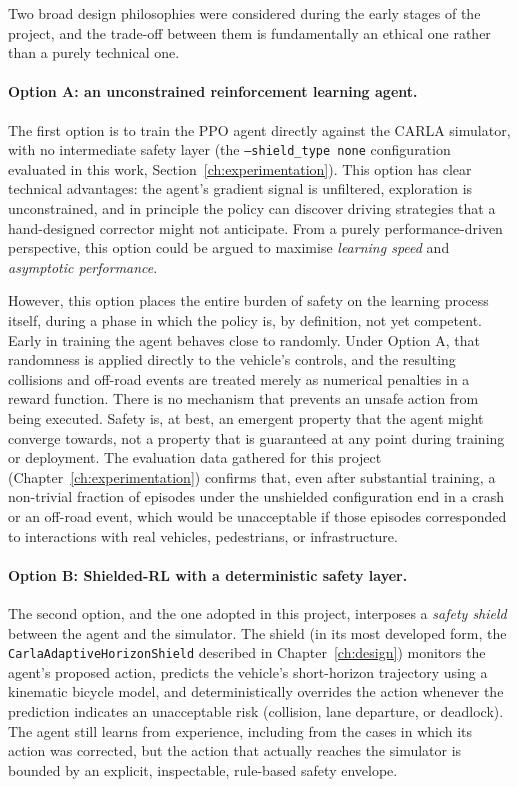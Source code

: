Two broad design philosophies were considered during the early stages of the project,
and the trade-off between them is fundamentally an ethical one rather than a purely
technical one.

\paragraph{Option A: an unconstrained reinforcement learning agent.}
The first option is to train the PPO agent directly against the CARLA simulator, with no
intermediate safety layer (the \texttt{--shield\_type none} configuration evaluated in
this work, Section~\ref{ch:experimentation}). This option has clear technical
advantages: the agent's gradient signal is unfiltered, exploration is unconstrained, and
in principle the policy can discover driving strategies that a hand-designed corrector
might not anticipate. From a purely performance-driven perspective, this option could be
argued to maximise \textit{learning speed} and \textit{asymptotic performance}.

However, this option places the entire burden of safety on the learning process itself,
during a phase in which the policy is, by definition, not yet competent. Early in
training the agent behaves close to randomly. Under Option A, that randomness is applied
directly to the vehicle's controls, and the resulting collisions and off-road events are
treated merely as numerical penalties in a reward function. There is no mechanism that
prevents an unsafe action from being executed. Safety is, at best, an emergent
property that the agent might converge towards, not a property that is guaranteed at any
point during training or deployment. The evaluation data gathered for this project
(Chapter~\ref{ch:experimentation}) confirms that, even after substantial training, a
non-trivial fraction of episodes under the unshielded configuration end in a crash or an
off-road event, which would be unacceptable if those episodes corresponded to interactions
with real vehicles, pedestrians, or infrastructure.

\paragraph{Option B: Shielded-RL with a deterministic safety layer.}
The second option, and the one adopted in this project, interposes a \textit{safety
shield} between the agent and the simulator. The shield (in its most developed form,
the \texttt{CarlaAdaptiveHorizonShield} described in Chapter~\ref{ch:design})
monitors the agent's proposed action, predicts the vehicle's short-horizon trajectory
using a kinematic bicycle model, and deterministically overrides the action whenever the
prediction indicates an unacceptable risk (collision, lane departure, or deadlock). The
agent still learns from experience, including from the cases in which its action was
corrected, but the action that actually reaches the simulator is bounded by an explicit,
inspectable, rule-based safety envelope.

